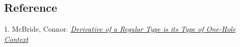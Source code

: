 \documentclass[12pt]{article}
\numberwithin{equation}{section}
\begin{document}
\subsection{Reference}
1. McBride, Connor. \href{http://strictlypositive.org/diff.pdf}{\emph{Derivative of a Regular Type is its Type of One-Hole Context}}
\end{document}
